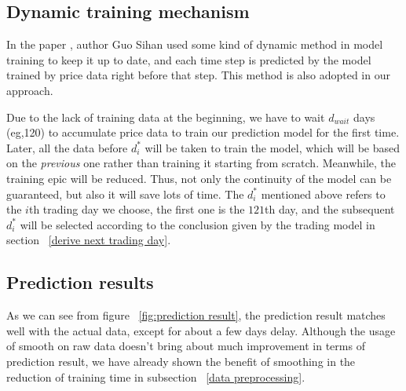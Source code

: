 \documentclass{mcmthesis}
\begin{document}
\subsection{Dynamic training mechanism}
In the paper \cite{4}, author Guo Sihan used some kind of  dynamic method in model training to keep it up to date, and each time step is predicted by the model trained by price data right before that step. This method is also adopted in our approach.


Due to the lack of training data at the beginning, we have to wait $d_{wait}$ days (eg,120) to accumulate price data to train our prediction model for the first time. Later, all the data before $d_i^*$ will be taken to train the model, which will be based on the \emph{previous} one rather than training it starting from scratch. Meanwhile, the training epic will be reduced. Thus, not only the continuity of the model can be guaranteed, but also it will save lots of time. The $d_i^*$ mentioned above refers to the $i$th trading day we choose, the first one is the $121$th day, and the subsequent $d_i^*$ will be selected according to the conclusion given by the trading model in section ~\ref{derive next trading day}.

\subsection{Prediction results}\label{details about ppm}
As we can see from figure ~\ref{fig:prediction result}, the prediction result matches well with the actual data, except for about a few days delay. Although the usage of smooth on raw data doesn't bring about much improvement in terms of prediction result, we have already shown the benefit of smoothing in the reduction of training time in subsection  ~\ref{data preprocessing}.
\end{document}
